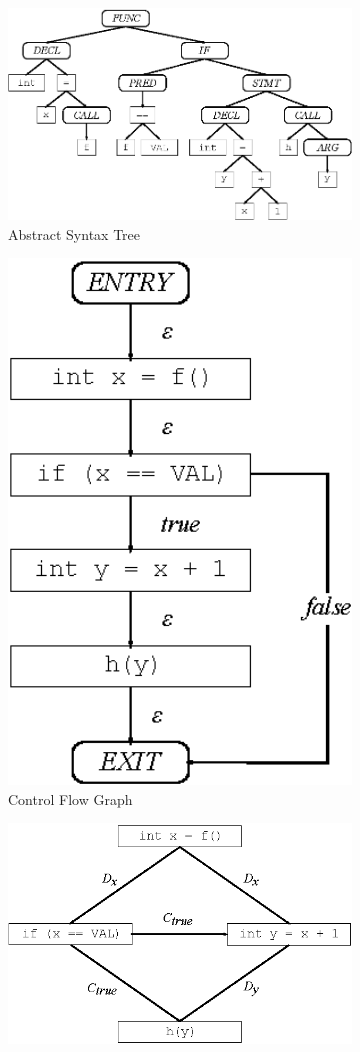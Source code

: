 \begin{figure}[ht]
	\centering
	\begin{subfigure}[t]{0.3\textwidth}
		\centering
		\includegraphics[width=1\textwidth,height=0.65\textwidth,keepaspectratio]{./figure/ast.eps}
		\caption{Abstract Syntax Tree}
		\label{figure:ast}
	\end{subfigure}
	\begin{subfigure}[t]{0.3\textwidth}
		\centering
		\includegraphics[width=2\textwidth,height=0.65\textwidth,keepaspectratio]{./figure/cfg.eps}
		\caption{Control Flow Graph}
		\label{figure:cfg}
	\end{subfigure}
	\begin{subfigure}[t]{0.3\textwidth}
		\centering
		\includegraphics[width=1\textwidth,height=0.65\textwidth,keepaspectratio]{./figure/pdg.eps}

\end{subfigure}
\end{figure}
